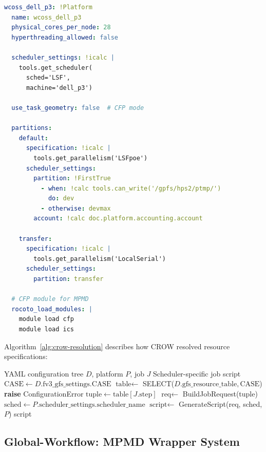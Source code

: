 \documentclass[11pt,twoside]{article}
\newcommand{\crow}{\textsc{CROW}}
\begin{document}
\begin{lstlisting}[language=YAML, caption={\crow{} WCOSS Dell P3 Configuration}]
wcoss_dell_p3: !Platform
  name: wcoss_dell_p3
  physical_cores_per_node: 28
  hyperthreading_allowed: false
  
  scheduler_settings: !icalc |
    tools.get_scheduler(
      sched='LSF',
      machine='dell_p3')
  
  use_task_geometry: false  # CFP mode
  
  partitions:
    default:
      specification: !icalc |
        tools.get_parallelism('LSFpoe')
      scheduler_settings:
        partition: !FirstTrue
          - when: !calc tools.can_write('/gpfs/hps2/ptmp/')
            do: dev
          - otherwise: devmax
        account: !calc doc.platform.accounting.account
        
    transfer:
      specification: !icalc |
        tools.get_parallelism('LocalSerial')
      scheduler_settings:
        partition: transfer
        
  # CFP module for MPMD
  rocoto_load_modules: |
    module load cfp
    module load ics
\end{lstlisting}

Algorithm~\ref{alg:crow-resolution} describes how \crow{} resolved resource specifications:

\begin{algorithm}[H]
\caption{\crow{} Resource Resolution}
\label{alg:crow-resolution}
\begin{algorithmic}[1]
\REQUIRE YAML configuration tree $D$, platform $P$, job $J$
\ENSURE Scheduler-specific job script
\STATE $\text{CASE} \gets D.\text{fv3\_gfs\_settings.CASE}$ 
\STATE $\text{table} \gets$ SELECT($D.\text{gfs\_resource\_table}, \text{CASE}$)
    \STATE \textbf{raise} ConfigurationError
\ENDIF
\STATE $\text{tuple} \gets \text{table}[J.\text{step}]$ 
\STATE $\text{req} \gets$ BuildJobRequest(tuple)
\STATE $\text{sched} \gets P.\text{scheduler\_settings.scheduler\_name}$
\STATE $\text{script} \gets$ GenerateScript(req, sched, $P$)
\RETURN script
\end{algorithmic}
\end{algorithm}

\subsection{Global-Workflow: MPMD Wrapper System}
\label{sec:gw-mpmd}
\end{document}
